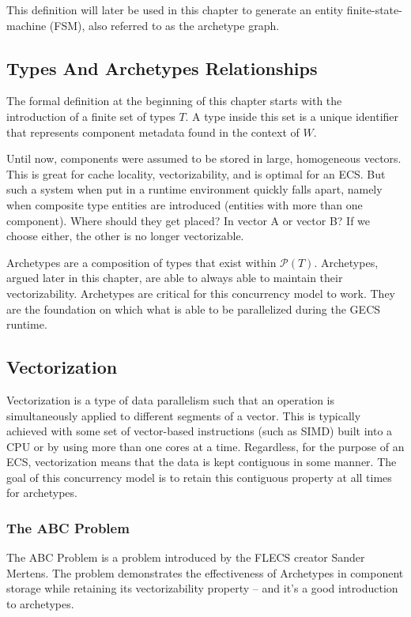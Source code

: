 This definition will later be used in this chapter to generate an entity finite-state-machine (FSM), also referred to as the archetype graph.

\subsection{Types And Archetypes Relationships}
The formal definition at the beginning of this chapter starts with the introduction of a finite set of types $T$. A type inside this set is a unique identifier that represents component metadata found in the context of $W$.

Until now, components were assumed to be stored in large, homogeneous vectors. This is great for cache locality, vectorizability, and is optimal for an ECS. But such a system when put in a runtime environment quickly falls apart, namely when composite type entities are introduced (entities with more than one component). Where should they get placed? In vector A or vector B? If we choose either, the other is no longer vectorizable. 

Archetypes are a composition of types that exist within $\mathcal{P}(T)$. Archetypes, argued later in this chapter, are able to always able to maintain their vectorizability. Archetypes are critical for this concurrency model to work. They are the foundation on which what is able to be parallelized during the GECS runtime. \cite{SanderMertensECS}

\subsection{Vectorization}
Vectorization is a type of data parallelism such that an operation is simultaneously applied to different segments of a vector. This is typically achieved with some set of vector-based instructions (such as SIMD) built into a CPU or by using more than one cores at a time. Regardless, for the purpose of an ECS, vectorization means that the data is kept contiguous in some manner. The goal of this concurrency model is to retain this contiguous property at all times for archetypes. \cite{vectorization_wolfe_michael}

\subsubsection{The ABC Problem}


The ABC Problem is a problem introduced by the FLECS creator Sander Mertens.\cite{SanderMertensECS} The problem demonstrates the effectiveness of Archetypes in component storage while retaining its vectorizability property -- and it's a good introduction to archetypes.

